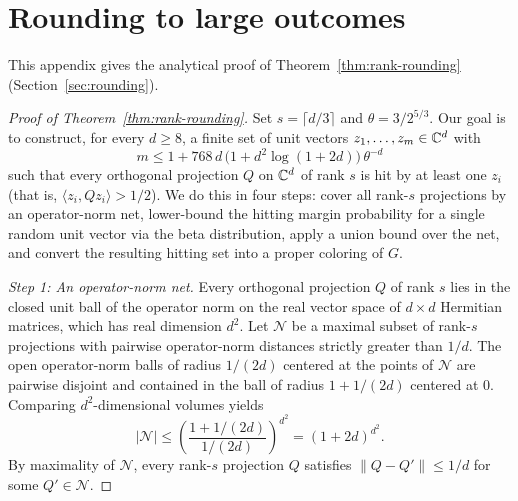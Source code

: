 \section{Rounding to large outcomes}\label{app:rounding}

This appendix gives the analytical proof of Theorem~\ref{thm:rank-rounding} (Section~\ref{sec:rounding}).

\begin{proof}[Proof of Theorem~\ref{thm:rank-rounding}]
Set $s=\lceil d/3\rceil$ and $\theta=3/2^{5/3}$. Our goal is to construct, for every $d\ge8$, a finite set of unit vectors $z_1,\ldots,z_m\in\mathbb C^d$ with
\begin{equation}\label{eq:hitting-number}
 m\le 1+768\,d\,\bigl(1+d^2\log(1+2d)\bigr)\,\theta^{-d}
\end{equation}
such that every orthogonal projection $Q$ on $\mathbb C^d$ of rank $s$ is hit by at least one $z_i$ (that is, $\langle z_i,Qz_i\rangle>1/2$). We do this in four steps: cover all rank-$s$ projections by an operator-norm net, lower-bound the hitting margin probability for a single random unit vector via the beta distribution, apply a union bound over the net, and convert the resulting hitting set into a proper coloring of $G$.

\emph{Step 1: An operator-norm net.} Every orthogonal projection $Q$ of rank $s$ lies in the closed unit ball of the operator norm on the real vector space of $d\times d$ Hermitian matrices, which has real dimension $d^2$. Let $\mathcal N$ be a maximal subset of rank-$s$ projections with pairwise operator-norm distances strictly greater than $1/d$. The open operator-norm balls of radius $1/(2d)$ centered at the points of $\mathcal N$ are pairwise disjoint and contained in the ball of radius $1+1/(2d)$ centered at $0$. Comparing $d^2$-dimensional volumes yields
\[
 |\mathcal N|\le \left(\frac{1+1/(2d)}{1/(2d)}\right)^{d^2}=(1+2d)^{d^2}.
\]
By maximality of $\mathcal N$, every rank-$s$ projection $Q$ satisfies $\|Q-Q'\|\le1/d$ for some $Q'\in\mathcal N$.


\end{proof}
